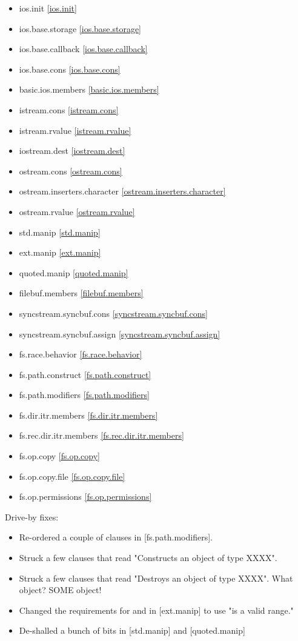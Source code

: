 \begin{multicols}{2}
\begin{itemize}
\item{ios.init}							\ref{ios.init}
\item{ios.base.storage}					\ref{ios.base.storage}
\item{ios.base.callback}				\ref{ios.base.callback}
\item{ios.base.cons}					\ref{ios.base.cons}
\item{basic.ios.members}				\ref{basic.ios.members}
\item{istream.cons}						\ref{istream.cons}
\item{istream.rvalue}					\ref{istream.rvalue}
\item{iostream.dest}					\ref{iostream.dest}
\item{ostream.cons}						\ref{ostream.cons}
\item{ostream.inserters.character}		\ref{ostream.inserters.character}
\item{ostream.rvalue}					\ref{ostream.rvalue}
\item{std.manip}						\ref{std.manip}
\item{ext.manip}						\ref{ext.manip}
\item{quoted.manip}						\ref{quoted.manip}
\item{filebuf.members}					\ref{filebuf.members}
\item{syncstream.syncbuf.cons}			\ref{syncstream.syncbuf.cons}
\item{syncstream.syncbuf.assign}		\ref{syncstream.syncbuf.assign}
\item{fs.race.behavior}					\ref{fs.race.behavior}
\item{fs.path.construct}				\ref{fs.path.construct}
\item{fs.path.modifiers}				\ref{fs.path.modifiers}
\item{fs.dir.itr.members}				\ref{fs.dir.itr.members}
\item{fs.rec.dir.itr.members}			\ref{fs.rec.dir.itr.members}
\item{fs.op.copy}						\ref{fs.op.copy}
\item{fs.op.copy.file}					\ref{fs.op.copy.file}
\item{fs.op.permissions}				\ref{fs.op.permissions}
\end{itemize}
\end{multicols}

Drive-by fixes:
\begin{itemize}
\item{Re-ordered a couple of clauses in [fs.path.modifiers]. }
\item{Struck a few clauses that read "Constructs an object of type XXXX".}
\item{Struck a few clauses that read "Destroys an object of type XXXX". What object? SOME object!}
\item{Changed the requirements for  and  in [ext.manip] to use "is a valid range."}
\item{De-shalled a bunch of bits in [std.manip] and [quoted.manip]}
\end{itemize}

